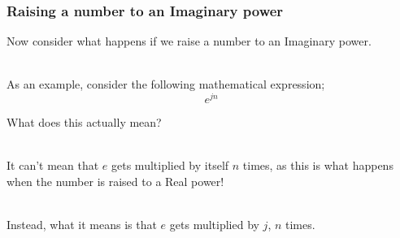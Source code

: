 \begin{frame}[t]

	\frametitle{Raising a number to an Imaginary power}

	Now consider what happens if we raise a number to an Imaginary power.\\~

	As an example, consider the following mathematical expression;
	\begin{equation} \label{eqn_slide_9_a}
	e^{jn}
	\end{equation}

	What does this actually mean?\\~

	It can't mean that \(e\) gets multiplied by itself \(n\) times, as this is
	what happens when the number is raised to a Real power!\\~

	Instead, what it means is that \(e\) gets multiplied by \(j\), \(n\) times.



\end{frame}
